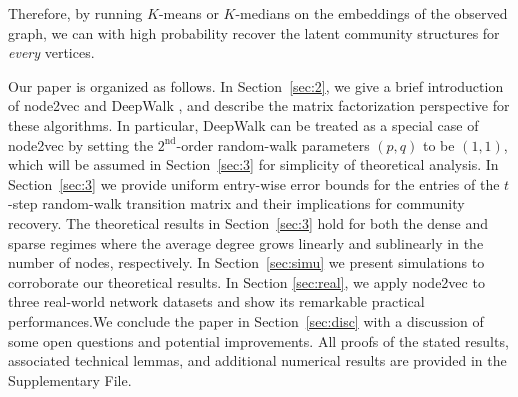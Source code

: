 \documentclass[10pt,journal,compsoc]{IEEEtran}
\newcommand{\M}[1]{{{\mathbf{\MakeUppercase{#1}}}}}
\numberwithin{equation}{section}
\begin{document}
Therefore, by running $K$-means or $K$-medians on the
embeddings of the observed graph, we can with high probability recover the latent community structures for {\em every} vertices. %

Our paper is organized as follows. In Section~\ref{sec:2}, we give a brief introduction of 
node2vec \cite{grover2016node2vec} and DeepWalk \cite{perozzi2014deepwalk}, and describe the matrix factorization
perspective for these algorithms. In particular, DeepWalk
can be treated as a special case of node2vec by setting the $2^{\mathrm{nd}}$-order
random-walk parameters $(p,q)$ to be $(1,1)$, which will be
assumed in Section~\ref{sec:3} for simplicity of theoretical
analysis. In Section~\ref{sec:3} we provide uniform entry-wise error
bounds for the entries of the $t$-step random-walk
transition matrix and their implications for community recovery. 
The theoretical results in Section~\ref{sec:3} hold
for both the dense and sparse regimes where the average degree grows
linearly and sublinearly in the number of nodes, respectively. 
In Section~\ref{sec:simu} we present simulations to corroborate our theoretical
results. In Section \ref{sec:real}, we apply node2vec to three real-world network datasets and show its remarkable practical performances.We conclude the paper in Section~\ref{sec:disc} with a discussion of some open
questions and potential improvements. All proofs of the stated results,  associated technical
lemmas, and additional numerical results are provided in the Supplementary File. 

\end{document}
